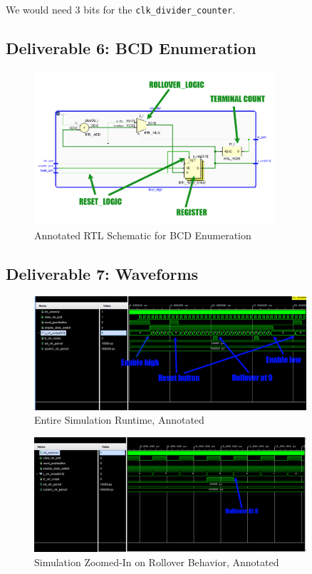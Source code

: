 \documentclass[10pt]{article}
\begin{document}
We would need 3 bits for the \texttt{clk\_divider\_counter}.

\subsection*{Deliverable 6: BCD Enumeration}

\begin{figure} [H]
  \center
  \includegraphics[width=0.8\textwidth]{figures/deliverable6_annotated.png}
  \caption{Annotated RTL Schematic for BCD Enumeration}
\end{figure}
 
\subsection*{Deliverable 7: Waveforms}

\begin{figure} [H]
  \center
  \includegraphics[width=0.9\textwidth]{figures/full_sim_annotated.png}
  \caption{Entire Simulation Runtime, Annotated}
\end{figure}

\begin{figure} [H]
  \center
  \includegraphics[width=0.9\textwidth]{figures/rollover_waveform_annoteated.png}
  \caption{Simulation Zoomed-In on Rollover Behavior, Annotated}
\end{figure}
\end{document}
